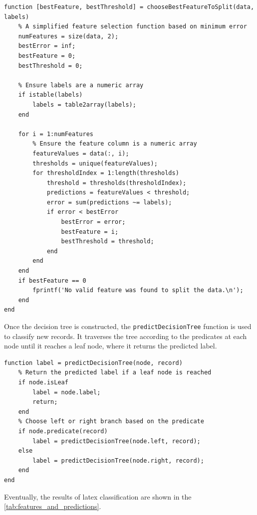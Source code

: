 \documentclass[12pt, onecolumn]{article}
\begin{document}
\begin{verbatim}
function [bestFeature, bestThreshold] = chooseBestFeatureToSplit(data, labels)
    % A simplified feature selection function based on minimum error
    numFeatures = size(data, 2);
    bestError = inf;
    bestFeature = 0;
    bestThreshold = 0;

    % Ensure labels are a numeric array
    if istable(labels)
        labels = table2array(labels);
    end

    for i = 1:numFeatures
        % Ensure the feature column is a numeric array
        featureValues = data(:, i);
        thresholds = unique(featureValues);
        for thresholdIndex = 1:length(thresholds)
            threshold = thresholds(thresholdIndex);
            predictions = featureValues < threshold;
            error = sum(predictions ~= labels);
            if error < bestError
                bestError = error;
                bestFeature = i;
                bestThreshold = threshold;
            end
        end
    end
    if bestFeature == 0
        fprintf('No valid feature was found to split the data.\n');
    end
end
\end{verbatim}

Once the decision tree is constructed, the \texttt{predictDecisionTree} function is used to classify new records. It traverses the tree according to the predicates at each node until it reaches a leaf node, where it returns the predicted label.

\begin{verbatim}
function label = predictDecisionTree(node, record)
    % Return the predicted label if a leaf node is reached
    if node.isLeaf
        label = node.label;
        return;
    end
    % Choose left or right branch based on the predicate
    if node.predicate(record)
        label = predictDecisionTree(node.left, record);
    else
        label = predictDecisionTree(node.right, record);
    end
end
\end{verbatim}
Eventually, the results of latex classification are shown in the \ref{tab:features_and_predictions}.
\end{document}

